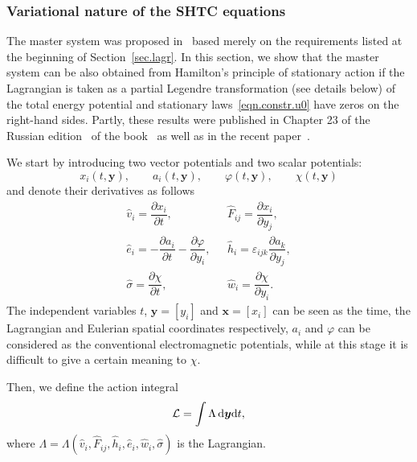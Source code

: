 \documentclass[twoside]{article}
\newcommand{\xx}{{\boldsymbol{x}}}
\newcommand{\yy}{{\boldsymbol{y}}}
\newcommand{\pd}{\partial}
\newcommand{\rmd}{{\rm d}}
\begin{document}
\subsubsection{Variational nature of the SHTC equations}\label{sec.variation}

The master system was proposed in~\cite{GodRom1996a} based merely on the 
requirements listed at the beginning of Section~\ref{sec.lagr}. In this 
section, we show 
that the master system can be also obtained from Hamilton's principle of 
stationary action if the Lagrangian is taken as a partial Legendre 
transformation (see details below) of the total energy potential 
and stationary 
laws~\eqref{eqn.constr.u0} have zeros on the right-hand sides. Partly, 
these results were published in Chapter 23 of the Russian 
edition~\cite{GodRom1998} of the book~\cite{GodRom2003} as well as in the 
recent paper~\cite{DPRZ2017}.

We start by introducing two vector potentials and two scalar potentials:
% 
\begin{equation}
x_i(t,\yy), \qquad a_i(t,\yy),\qquad \varphi(t,\yy), \qquad 
\chi(t,\yy)
\end{equation}
and denote their derivatives as follows
\begin{subequations}\label{eqn.potentials}
\begin{align}
\hat{v}_i=\dfrac{\pd x_i}{\pd t},\ \ \  & \hat{F}_{ij}=\dfrac{\pd x_i}{\pd 
y_j},\label{eqn.PotentialDeriv1}\\
\hat{e}_i=-\dfrac{\pd a_i}{\pd t} - \dfrac{\pd \varphi}{\pd y_i},\ \ \ & 
\hat{h}_i=\varepsilon_{ijk}\dfrac{\pd a_k}{\pd 
y_j},\label{eqn.PotentialDeriv2}\\
\hat{\sigma}=\dfrac{\pd \chi}{\pd t},\ \ \ & \hat{w}_i=\dfrac{\pd \chi}{\pd 
y_i}.\label{eqn.PotentialDeriv3}
\end{align}
\end{subequations}
The independent variables $ t $, $ \yy=[y_i] $ and $ \xx=[x_i] $ can be seen as 
the time, the Lagrangian and Eulerian
spatial coordinates respectively, $a_i$ and $\varphi$ can be considered as the
conventional electromagnetic potentials, while at this stage it is difficult to 
give a certain meaning to $ \chi $.

Then, we define the action integral
\begin{equation}\label{eqn.Lagrangian}
\mathcal{L} = \int \Lambda \, \rmd \yy \rmd t,
\end{equation}
where $ 
\Lambda=\Lambda(\hat{v}_i,\hat{F}_{ij},\hat{h}_i,\hat{e}_i,\hat{w}_i,\hat{\sigma})
 $ 
is the Lagrangian.
\end{document}
